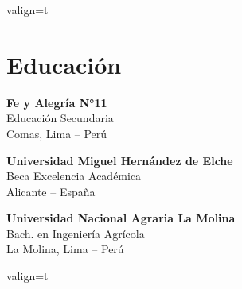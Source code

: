 \documentclass[a4paper,10pt]{article}
\begin{document}
\begin{adjustbox}{valign=t}
\begin{minipage}{0.3\textwidth}
\MySkip 
\section*{Educación}
	\begin{description}
	\raggedright
	\item [\normalfont \textcolor{ColorOne}{2014.}] \textbf{Fe y Alegría N°11}\\
	Educación Secundaria\\
	Comas, Lima -- Perú

	\item [\normalfont \textcolor{ColorOne}{2021.}] \textbf{Universidad Miguel Hernández de Elche}\\
	Beca Excelencia Académica\\
	Alicante -- España
 
	\item [\normalfont \textcolor{ColorOne}{2022.}] \textbf{Universidad Nacional Agraria La Molina}\\
	Bach. en Ingeniería Agrícola\\
	La Molina, Lima -- Perú

\end{description}

\end{minipage}
\end{adjustbox}
%
%
%
\hfill
\begin{adjustbox}{valign=t}
\begin{minipage}{0.05\textwidth} %
\MyVerticalRule  %
\end{minipage}
\end{adjustbox}
\hfill
%
\end{document}
